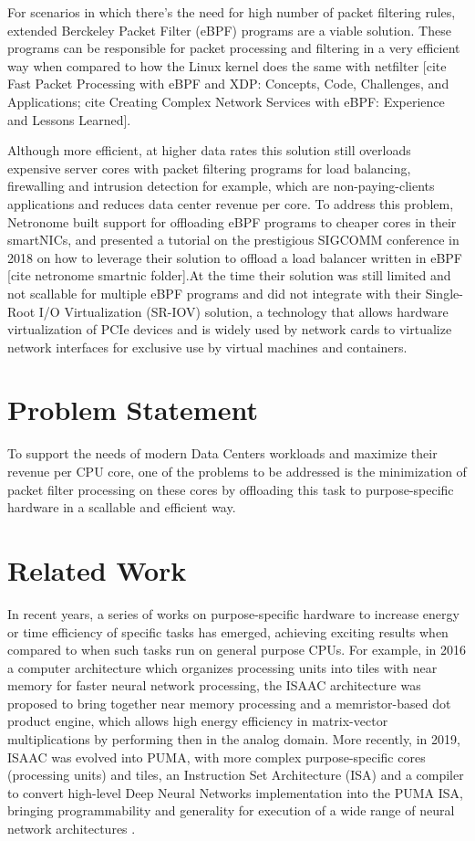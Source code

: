 \documentclass[conference]{IEEEtran}
\begin{document}
For scenarios in which there's the need for high number of packet filtering rules, extended Berckeley Packet Filter (eBPF) programs are a viable solution. These programs can be responsible for packet processing and filtering in a very efficient way when compared to how the Linux kernel does the same with netfilter [cite Fast Packet Processing with eBPF and XDP: Concepts, Code,
Challenges, and Applications; cite Creating Complex Network Services with eBPF:
Experience and Lessons Learned].

Although more efficient, at higher data rates this solution still overloads expensive server cores with packet filtering programs for load balancing, firewalling and intrusion detection for example, which are non-paying-clients applications and reduces data center revenue per core. To address this problem, Netronome built support for offloading eBPF programs to cheaper cores in their smartNICs, and presented a tutorial on the prestigious SIGCOMM conference in 2018 on how to leverage their solution to offload a load balancer written in eBPF [cite netronome smartnic folder].At the time their solution was still limited and not scallable for multiple eBPF programs and did not integrate with their Single-Root I/O Virtualization (SR-IOV) solution, a technology that allows hardware virtualization of PCIe devices and is widely used by network cards to virtualize network interfaces for exclusive use by virtual machines and containers.

\section{Problem Statement}
To support the needs of modern Data Centers workloads and maximize their revenue per CPU core, one of the problems to be addressed is the minimization of packet filter processing on these cores by offloading this task to purpose-specific hardware in a scallable and efficient way.

\section{Related Work}
\label{sec:rel-works}

In recent years, a series of works on purpose-specific hardware to increase energy or time efficiency of specific tasks has emerged, achieving exciting results when compared to when such tasks run on general purpose CPUs. For example, in 2016 a computer architecture which organizes processing units into tiles with near memory for faster neural network processing, the ISAAC \cite{shafiee2016isaac} architecture was proposed to bring together near memory processing and a memristor-based dot product engine, which allows high energy efficiency in matrix-vector multiplications by performing then in the analog domain. More recently, in 2019, ISAAC was evolved into PUMA, with more complex purpose-specific cores (processing units) and tiles, an Instruction Set Architecture (ISA) and a compiler to convert high-level Deep Neural Networks implementation into the PUMA ISA, bringing programmability and generality for execution of a wide range of neural network architectures \cite{ankit2019puma}.
\end{document}
